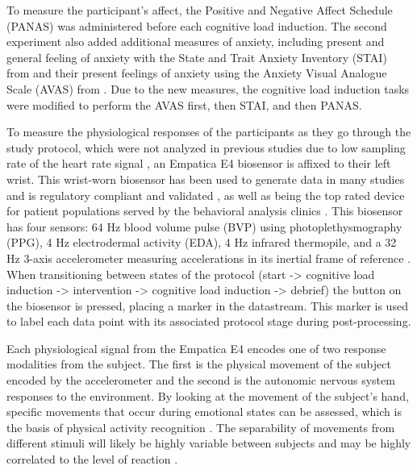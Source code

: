 \documentclass[12pt]{iopart}
\begin{document}
To measure the participant's affect, the Positive and Negative Affect Schedule (PANAS)\cite{watson1988development} was administered before each cognitive load induction.  The second experiment also added additional measures of anxiety, including present and general feeling of anxiety with the State and Trait Anxiety Inventory (STAI) from \cite{spielberger1999measuring} and their present feelings of anxiety using the Anxiety Visual Analogue Scale (AVAS) from \cite{cella1986reliability}.  Due to the new measures, the cognitive load induction tasks were modified to perform the AVAS first, then STAI, and then PANAS.

To measure the physiological responses of the participants as they go through the study protocol, which were not analyzed in previous studies due to low sampling rate of the heart rate signal \cite{shaffer2017overview, thayer2022effects, Stevens2020EffectsOH}, an Empatica E4 biosensor is affixed to their left wrist.  This wrist-worn biosensor has been used to generate data in many studies \cite{goodwin2019predicting, thayer2022effects, schmidt2018introducing} and is regulatory compliant and validated \cite{poh2010wearable}, as well as being the top rated device for patient populations served by the behavioral analysis clinics \cite{taj2018review}.  This biosensor has four sensors: 64 Hz blood volume pulse (BVP) using photoplethysmography (PPG), 4 Hz electrodermal activity (EDA), 4 Hz infrared thermopile, and a 32 Hz 3-axis accelerometer measuring accelerations in its inertial frame of reference \cite{goodwin2019predicting}.  When transitioning between states of the protocol (start -> cognitive load induction -> intervention -> cognitive load induction -> debrief) the button on the biosensor is pressed, placing a marker in the datastream.  This marker is used to label each data point with its associated protocol stage during post-processing.

Each physiological signal from the Empatica E4 encodes one of two response modalities from the subject.  The first is the physical movement of the subject encoded by the accelerometer and the second is the autonomic nervous system responses to the environment.  By looking at the movement of the subject’s hand, specific movements that occur during emotional states can be assessed, which is the basis of physical activity recognition \cite{ravi2005activity}.  The separability of movements from different stimuli will likely be highly variable between subjects and may be highly correlated to the level of reaction \cite{thang2012gait}.
\end{document}
